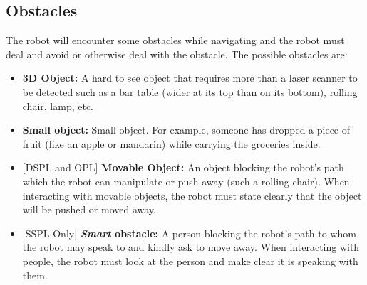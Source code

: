 \subsection{Obstacles}
The robot will encounter some obstacles while navigating and the robot must deal and avoid or otherwise deal with the obstacle.
The possible obstacles are:
\begin{itemize}
  \item \textbf{3D Object:} A hard to see object that requires more than a laser scanner to be detected such as a bar table (wider at its top than on its bottom), rolling chair, lamp, etc.

  \item \textbf{Small object:} Small object. For example, someone has dropped a piece of fruit (like an apple or mandarin) while carrying the groceries inside.

  \item {[DSPL and OPL]} \textbf{Movable Object:} An object blocking the robot's path which the robot can manipulate or push away (such a rolling chair). When interacting with movable objects, the robot must state clearly that the object will be pushed or moved away.

  \item {[SSPL Only]} \textbf{\textit{Smart} obstacle:} A person blocking the robot's path to whom the robot may speak to and kindly ask to move away. When interacting with people, the robot must look at the person and make clear it is speaking with them.
\end{itemize}



